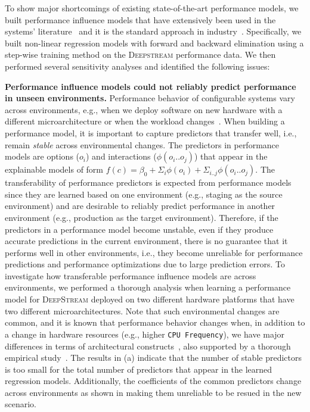 To show major shortcomings of existing state-of-the-art performance models, we built performance influence models that have extensively been used in the systems' literature~\cite{siegmund2015performance,JSVKPA:ASE17,GCASW:ASE13,GSKA:SPPEXA,kolesnikov2019tradeoffs,kaltenecker2020interplay,muhlbauer2019accurate,grebhahn2019predicting,siegmund2020dimensions} and it is the standard approach in industry~\cite{kolesnikov2019tradeoffs,kaltenecker2020interplay}. Specifically, we built non-linear regression models with forward and backward elimination using a step-wise training method on the \textsc{Deepstream} performance data. We then performed several sensitivity analyses and identified the following issues: 
\besq
    \item \textbf{Performance influence models could not reliably predict performance in unseen environments.} 
    Performance behavior of configurable systems vary across environments, e.g., when we deploy software on new hardware with a different microarchitecture or when the workload changes~\cite{JSVKPA:ASE17,JVKSK:SEAMS17,JVKS:FSE18,iqbal_transfer_2019,VPGFC:ICPE17}. When building a performance model, it is important to capture predictors that transfer well, i.e., remain \emph{stable} across environmental changes. The predictors in performance models are options ($o_i$) and interactions ($\phi(o_i..o_j)$) that appear in the explainable models of form $f(c)=\beta_0+\Sigma_{i}{\phi(o_i)}+\Sigma_{i..j}{\phi(o_i..o_j)}$. The transferability of performance predictors is expected from performance models since they are learned based on one environment (e.g., staging as the source environment) and are desirable to reliably predict performance in another environment (e.g., production as the target environment). 
    Therefore, if the predictors in a performance model become unstable, even if they produce accurate predictions in the current environment, there is no guarantee that it performs well in other environments, i.e., they become unreliable for performance predictions and performance optimizations due to large prediction errors. 
    To investigate how transferable performance influence models are across environments, we performed a thorough analysis when learning a performance model for \textsc{DeepStream} deployed on two different hardware platforms that have two different microarchitectures. Note that such environmental changes are common, and it is known that performance behavior changes when, in addition to a change in hardware resources (e.g., higher \texttt{CPU Frequency}), we have major differences in terms of architectural constructs~\cite{ding2021generalizable,curtsinger2013stabilizer}, also supported by a thorough empirical study~\cite{JSVKPA:ASE17}. The results in  (a) indicate that the number of stable predictors is too small for the total number of predictors that appear in the learned regression models. Additionally, the coefficients of the common predictors change across environments as shown in  making them unreliable to be resued in the new scenario.  
    
